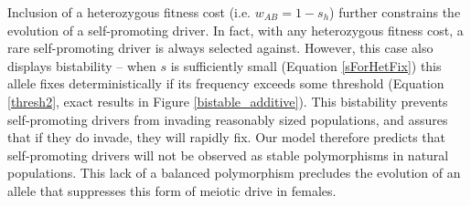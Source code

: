 \documentclass[12pt,letterpaper]{article}
\begin{document}
Inclusion of a heterozygous fitness cost (i.e. $w_{AB}=1-s_h$)
	further constrains the evolution of a self-promoting driver. 
In fact, with any heterozygous fitness cost, a rare self-promoting
	driver is always selected against. 
However, this case also displays bistability -- 
	when $s$ is sufficiently small (Equation \ref{sForHetFix}) this allele fixes deterministically if its 
	frequency exceeds some threshold  (Equation \ref{thresh2}, exact results in 
	Figure \ref{bistable_additive}).
This bistability prevents self-promoting drivers from invading 	
	reasonably sized populations, and assures that if they do invade, they will rapidly fix.
Our model therefore predicts that self-promoting drivers will not be
	observed as stable polymorphisms in natural populations. 
This lack of a balanced polymorphism %
	precludes the evolution of an
	allele that suppresses this form of meiotic drive in females.
\end{document}
